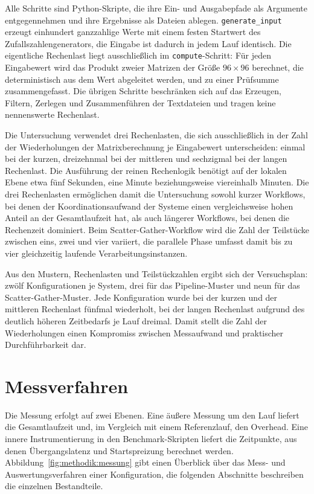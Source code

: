 Alle Schritte sind Python-Skripte, die ihre Ein- und Ausgabepfade
als Argumente entgegennehmen und ihre Ergebnisse als Dateien
ablegen. \texttt{generate\_input} erzeugt einhundert ganzzahlige
Werte mit einem festen Startwert des Zufallszahlengenerators, die
Eingabe ist dadurch in jedem Lauf identisch. Die eigentliche
Rechenlast liegt ausschließlich im \texttt{compute}-Schritt: Für
jeden Eingabewert wird das Produkt zweier Matrizen der Größe
$96 \times 96$ berechnet, die deterministisch aus dem Wert
abgeleitet werden, und zu einer Prüfsumme zusammengefasst. Die
übrigen Schritte beschränken sich auf das Erzeugen, Filtern,
Zerlegen und Zusammenführen der Textdateien und tragen keine
nennenswerte Rechenlast.

Die Untersuchung verwendet drei Rechenlasten, die sich
ausschließlich in der Zahl der Wiederholungen der Matrixberechnung
je Eingabewert unterscheiden: einmal bei der kurzen, dreizehnmal
bei der mittleren und sechzigmal bei der langen Rechenlast. Die
Ausführung der reinen Rechenlogik benötigt auf der lokalen Ebene
etwa fünf Sekunden, eine Minute beziehungsweise viereinhalb
Minuten. Die drei Rechenlasten ermöglichen damit die Untersuchung
sowohl kurzer Workflows, bei denen der Koordinationsaufwand der
Systeme einen vergleichsweise hohen Anteil an der Gesamtlaufzeit
hat, als auch längerer Workflows, bei denen die Rechenzeit
dominiert. Beim Scatter-Gather-Workflow wird die Zahl der
Teilstücke zwischen eins, zwei und vier variiert, die parallele
Phase umfasst damit bis zu vier gleichzeitig laufende
Verarbeitungsinstanzen.

Aus den Mustern, Rechenlasten und Teilstückzahlen ergibt sich der
Versuchsplan: zwölf Konfigurationen je System, drei für das Pipeline-Muster und neun für das Scatter-Gather-Muster. Jede Konfiguration wurde bei der kurzen und der mittleren Rechenlast fünfmal wiederholt, bei der langen Rechenlast aufgrund des deutlich höheren Zeitbedarfs je Lauf dreimal. Damit stellt die Zahl der Wiederholungen einen Kompromiss zwischen Messaufwand und praktischer Durchführbarkeit dar.


\section{Messverfahren}
\label{sec:methodik:messverfahren}

Die Messung erfolgt auf zwei Ebenen. Eine äußere Messung um den
Lauf liefert die Gesamtlaufzeit und, im Vergleich mit einem
Referenzlauf, den Overhead. Eine innere Instrumentierung in den
Benchmark-Skripten liefert die Zeitpunkte, aus denen Übergangslatenz
und Startspreizung berechnet werden.
Abbildung~\ref{fig:methodik:messung} gibt einen Überblick über das
Mess- und Auswertungsverfahren einer Konfiguration, die folgenden
Abschnitte beschreiben die einzelnen Bestandteile.

